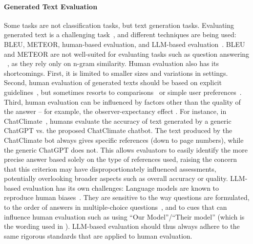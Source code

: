 \paragraph{Generated Text Evaluation} Some tasks are not classification tasks, but text generation tasks. Evaluating generated text is a challenging task~\cite{survey_nlg_eval}, and different techniques are being used: 
BLEU, METEOR, human-based evaluation, and LLM-based evaluation~\cite{mullappilly-etal-2023-arabic, cliamtebot_2022, s_vaghefi_chatclimate_2023, thulke2024climategpt}. BLEU and METEOR are not well-suited for evaluating tasks such as question answering ~\cite{chen-etal-2019-evaluating}, as they rely only on n-gram similarity.
Human evaluation also has its shortcomings. First, it is limited to smaller sizes and variations in settings. Second, human evaluation of generated texts should be based on explicit guidelines~\cite{thulke2024climategpt,bulian2024assessinglargelanguagemodels}, but sometimes resorts to comparisons~\cite{mullappilly-etal-2023-arabic, thulke2024climategpt} or simple user preferences~\cite{mullappilly-etal-2023-arabic}.
Third, human evaluation can be influenced by factors other than the quality of the answer -- for example, the observer-expectancy effect \cite{rosenthal1976}.
For instance, in ChatClimate~\cite{s_vaghefi_chatclimate_2023}, humans evaluate the accuracy of text generated by a generic ChatGPT vs. the proposed ChatClimate chatbot. The text produced by the ChatClimate bot always gives specific references (down to page numbers), while the generic ChatGPT does not. This allows evaluators to easily identify the more precise answer based solely on the type of references used, raising the concern that this criterion may have disproportionately influenced assessments, potentially overlooking broader aspects such as overall accuracy or quality. 
LLM-based evaluation has its own challenges: Language models are known to reproduce human biases~\cite{gallegos2024biasfairnesslargelanguage}. They are sensitive to the way questions are formulated, to the order of answers in multiple-choice questions~\cite{pezeshkpour-hruschka-2024-large}, and to cues that can influence human evaluation such as using ``Our Model''/``Their model'' (which is the wording used in \citet{mullappilly-etal-2023-arabic}).
LLM-based evaluation should thus always adhere to the same rigorous standards that are applied to human evaluation.

